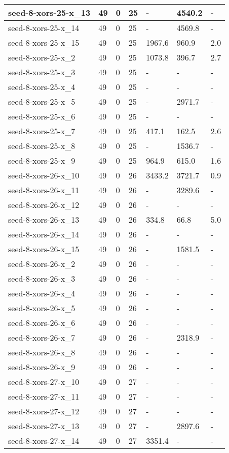 \begin{scriptsize}
\begin{longtable}{|p{5cm}|l|l|l|l|l|l|}
seed-8-xors-25-x\_13&49&0&25&-&4540.2&- \\ \hline 
seed-8-xors-25-x\_14&49&0&25&-&4569.8&- \\ \hline 
seed-8-xors-25-x\_15&49&0&25&1967.6&960.9&2.0 \\ \hline 
seed-8-xors-25-x\_2&49&0&25&1073.8&396.7&2.7 \\ \hline 
seed-8-xors-25-x\_3&49&0&25&-&-&- \\ \hline 
seed-8-xors-25-x\_4&49&0&25&-&-&- \\ \hline 
seed-8-xors-25-x\_5&49&0&25&-&2971.7&- \\ \hline 
seed-8-xors-25-x\_6&49&0&25&-&-&- \\ \hline 
seed-8-xors-25-x\_7&49&0&25&417.1&162.5&2.6 \\ \hline 
seed-8-xors-25-x\_8&49&0&25&-&1536.7&- \\ \hline 
seed-8-xors-25-x\_9&49&0&25&964.9&615.0&1.6 \\ \hline 
seed-8-xors-26-x\_10&49&0&26&3433.2&3721.7&0.9 \\ \hline 
seed-8-xors-26-x\_11&49&0&26&-&3289.6&- \\ \hline 
seed-8-xors-26-x\_12&49&0&26&-&-&- \\ \hline 
seed-8-xors-26-x\_13&49&0&26&334.8&66.8&5.0 \\ \hline 
seed-8-xors-26-x\_14&49&0&26&-&-&- \\ \hline 
seed-8-xors-26-x\_15&49&0&26&-&1581.5&- \\ \hline 
seed-8-xors-26-x\_2&49&0&26&-&-&- \\ \hline 
seed-8-xors-26-x\_3&49&0&26&-&-&- \\ \hline 
seed-8-xors-26-x\_4&49&0&26&-&-&- \\ \hline 
seed-8-xors-26-x\_5&49&0&26&-&-&- \\ \hline 
seed-8-xors-26-x\_6&49&0&26&-&-&- \\ \hline 
seed-8-xors-26-x\_7&49&0&26&-&2318.9&- \\ \hline 
seed-8-xors-26-x\_8&49&0&26&-&-&- \\ \hline 
seed-8-xors-26-x\_9&49&0&26&-&-&- \\ \hline 
seed-8-xors-27-x\_10&49&0&27&-&-&- \\ \hline 
seed-8-xors-27-x\_11&49&0&27&-&-&- \\ \hline 
seed-8-xors-27-x\_12&49&0&27&-&-&- \\ \hline 
seed-8-xors-27-x\_13&49&0&27&-&2897.6&- \\ \hline 
seed-8-xors-27-x\_14&49&0&27&3351.4&-&- \\ \hline 

\end{longtable}
\end{scriptsize}
